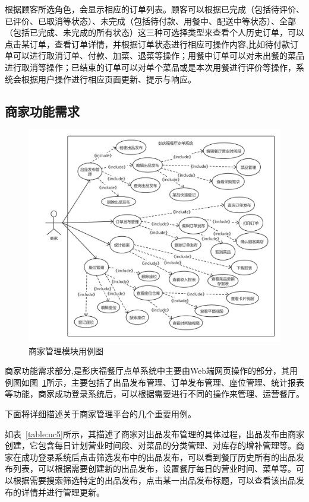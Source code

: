 根据顾客所选角色，会显示相应的订单列表。顾客可以根据已完成（包括待评价、已评价、已取消等状态）、未完成（包括待付款、用餐中、配送中等状态）、全部（包括已完成、未完成的所有状态）这三种可选择类型来查看个人历史订单，可以点击某订单，查看订单详情，并根据订单状态进行相应可操作内容,比如待付款订单可以进行取消订单、付款、加菜、退菜等操作；用餐中订单可以对未出餐的菜品进行取消等操作；已结束的订单可以对单个菜品或是本次用餐进行评价等操作，系统会根据用户操作进行相应页面更新、提示与响应。\\
 

\subsection{商家功能需求}
\begin{figure}[htbp!]
  \centering
  \includegraphics[width=5in]{FIGs/chapter3/seller.pdf}
  \caption{商家管理模块用例图}\label{fig_sellerCH3}
\end{figure}

商家功能需求部分,是彭庆福餐厅点单系统中主要由Web端网页操作的部分，其用例图如图~\ref{fig_sellerCH3}所示，主要包括了出品发布管理、订单发布管理、座位管理、统计报表等功能，商家成功登录系统后，可以根据需要进行不同的操作来管理、运营餐厅。

下面将详细描述关于商家管理平台的几个重要用例。

如表~\ref{table:uc5}所示，其描述了商家对出品发布管理的具体过程，出品发布由商家创建，它包含每日计划营业时间段、对菜品的分类管理、对库存的增补管理等。商家在成功登录系统后点击筛选发布中的出品发布，可以看到餐厅历史所有的出品发布列表，可以根据需要创建新的出品发布，设置餐厅每日的营业时间、菜单等。可以根据需要搜索筛选特定的出品发布，点击某一出品发布标题，可以查看该出品发布的详情并进行管理更新。


